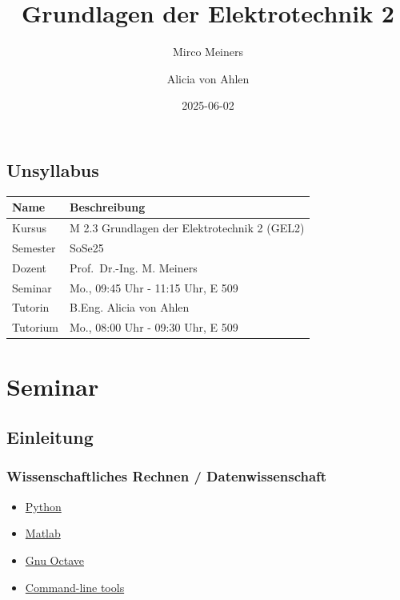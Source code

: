 \documentclass[
  ngerman,
  letterpaper,
]{scrbook}
\title{Grundlagen der Elektrotechnik 2}
\author{Mirco Meiners \and Alicia von Ahlen}
\date{2025-06-02}
\providecommand{\tightlist}{%
  \setlength{\itemsep}{0pt}\setlength{\parskip}{0pt}}
\renewcommand*\contentsname{Inhaltsverzeichnis}
\newcommand\contentsname{Inhaltsverzeichnis}
\begin{document}
\frontmatter
\maketitle

\renewcommand*\contentsname{Inhaltsverzeichnis}
{
\hypersetup{linkcolor=}
\setcounter{tocdepth}{2}
\tableofcontents
}

\mainmatter
{}

\chapter*{Unsyllabus}\label{unsyllabus}


\begin{longtable}[]{@{}ll@{}}
\toprule\noalign{}
Name & Beschreibung \\
\midrule\noalign{}
\endhead
\bottomrule\noalign{}
\endlastfoot
Kursus & M 2.3 Grundlagen der Elektrotechnik 2 (GEL2) \\
Semester & SoSe25 \\
Dozent & Prof.~Dr.-Ing. M. Meiners \\
Seminar & Mo., 09:45 Uhr - 11:15 Uhr, E 509 \\
Tutorin & B.Eng. Alicia von Ahlen \\
Tutorium & Mo., 08:00 Uhr - 09:30 Uhr, E 509 \\
\end{longtable}

\part{Seminar}

\chapter{Einleitung}\label{einleitung}

\section{Wissenschaftliches Rechnen /
Datenwissenschaft}\label{wissenschaftliches-rechnen-datenwissenschaft}

\begin{itemize}
\tightlist
\item
  \href{https://www.anaconda.com/download/}{Python}
\item
  \href{https://de.mathworks.com}{Matlab}
\item
  \href{https://www.gnu.org/software/octave/}{Gnu Octave}
\item
  \href{http://jeroenjanssens.com/2013/09/19/seven-command-line-tools-for-data-science.html}{Command-line
  tools}
\end{itemize}
\end{document}
